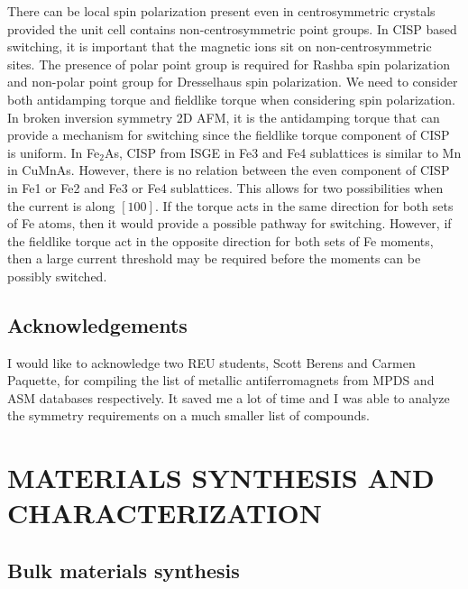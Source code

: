 \documentclass[10pt,doublespacing,edeposit]{uiucthesis2020}
\begin{document}
\begin{mainmatter}
There can be local spin polarization present even in centrosymmetric crystals provided the unit cell contains non-centrosymmetric point groups. In CISP based switching, it is important that the magnetic ions sit on non-centrosymmetric sites. The presence of polar point group is required for Rashba spin polarization and non-polar point group for Dresselhaus spin polarization. We need to consider both antidamping torque and fieldlike torque when considering spin polarization. In broken inversion symmetry 2D AFM, it is the antidamping torque that can provide a mechanism for switching since the fieldlike torque component of CISP is uniform. In Fe$_2$As, CISP from ISGE in Fe3 and Fe4 sublattices is similar to Mn in CuMnAs. However, there is no relation between the even component of CISP in Fe1 or Fe2 and Fe3 or Fe4 sublattices. This allows for two possibilities when the current is along $[100]$. If the torque acts in the same direction for both sets of Fe atoms, then it would provide a possible pathway for switching. However, if the fieldlike torque act in the opposite direction for both sets of Fe moments, then a large current threshold may be required before the moments can be possibly switched.

\section{Acknowledgements}


I would like to acknowledge two REU students, Scott Berens and Carmen Paquette, for compiling the list of metallic antiferromagnets from MPDS and ASM databases respectively. It saved me a lot of time and I was able to analyze the symmetry requirements on a much smaller list of compounds.





\chapter{MATERIALS SYNTHESIS AND CHARACTERIZATION}

\vspace{5mm}

\section{Bulk materials synthesis}



\end{mainmatter}
\end{document}
